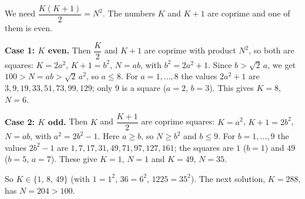 We need $\dfrac{K(K+1)}{2}=N^2$. The numbers $K$ and $K+1$ are coprime and one of them is even.

\textbf{Case 1: $K$ even.} Then $\dfrac {K}{2}$ and $K+1$ are coprime with product $N^2$, so both are squares: $K=2a^2$, $K+1=b^2$, $N=ab$, with $b^2=2a^2+1$. Since $b>\sqrt2\,a$, we get $100>N=ab>\sqrt2\,a^2$, so $a\le8$. For $a=1,\dots,8$ the values $2a^2+1$ are $3,9,19,33,51,73,99,129$; only $9$ is a square ($a=2$, $b=3$). This gives $K=8$, $N=6$.

\textbf{Case 2: $K$ odd.} Then $K$ and $\dfrac{K+1}{2}$ are coprime squares: $K=a^2$, $K+1=2b^2$, $N=ab$, with $a^2=2b^2-1$. Here $a\ge b$, so $N\ge b^2$ and $b\le9$. For $b=1,\dots,9$ the values $2b^2-1$ are $1,7,17,31,49,71,97,127,161$; the squares are $1$ ($b=1$) and $49$ ($b=5$, $a=7$). These give $K=1$, $N=1$ and $K=49$, $N=35$.

So $K\in\boxed{\{1,\,8,\,49\}}$ (with $1=1^2$, $36=6^2$, $1225=35^2$). The next solution, $K=288$, has $N=204>100$.
